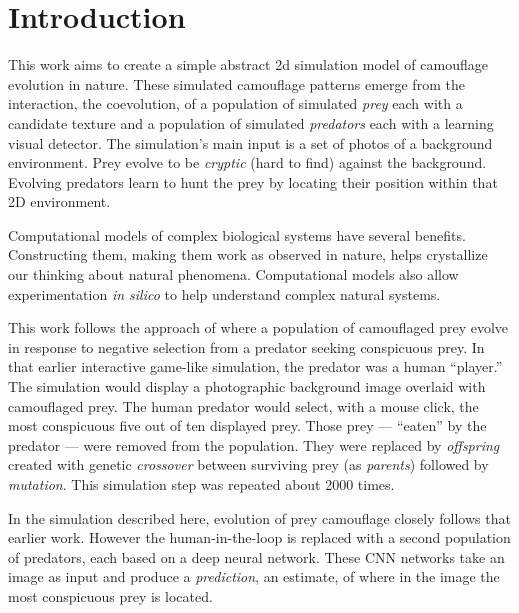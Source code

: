 \documentclass[letterpaper]{article}
\newcommand{\jargon}[1]{\textit{#1}}
\begin{document}

\section{Introduction}
This work aims to create a simple abstract 2d simulation model of camouflage evolution in nature. These simulated camouflage patterns emerge from the interaction, the coevolution, of a population of simulated \jargon{prey} each with a candidate texture and a population of simulated \jargon{predators} each with a learning visual detector. The simulation's main input is a set of photos of a background environment. Prey evolve to be \jargon{cryptic} (hard to find) against the background. Evolving predators learn to hunt the prey by locating their position within that 2D environment.
\par
Computational models of complex biological systems have several benefits. Constructing them, making them work as observed in nature, helps crystallize our thinking about natural phenomena. Computational models also allow experimentation \textit{in silico} to help understand complex natural systems.
\par
This work follows the approach of \citet{reynolds_iec_2011} where a population of camouflaged prey evolve in response to negative selection from a predator seeking conspicuous prey. In that earlier interactive game-like simulation, the predator was a human “player.” The simulation would display a photographic background image overlaid with camouflaged prey. The human predator would select, with a mouse click, the most conspicuous five out of ten displayed prey. Those prey — “eaten” by the predator — were removed from the population.  They were replaced by \jargon{offspring} created with genetic \jargon{crossover} between surviving prey (as \jargon{parents}) followed by \jargon{mutation}. This simulation step was repeated about 2000 times.
\par
In the simulation described here, evolution of prey camouflage closely follows that earlier work. However the human-in-the-loop is replaced with a second population of predators, each based on a deep neural network. These CNN networks take an image as input and produce a \jargon{prediction}, an estimate, of where in the image the most conspicuous prey is located.
\par
\end{document}
